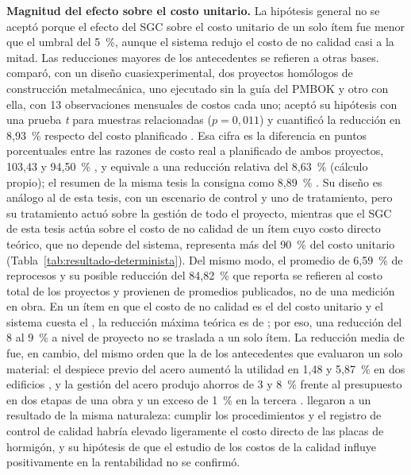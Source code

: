 \textbf{Magnitud del efecto sobre el costo unitario.} La hipótesis general no se aceptó porque el efecto del SGC sobre el costo unitario de un solo ítem fue menor que el umbral del 5~\%, aunque el sistema redujo el costo de no calidad casi a la mitad. Las reducciones mayores de los antecedentes se refieren a otras bases. \textcite[p.~22]{salazar2018} comparó, con un diseño cuasiexperimental, dos proyectos homólogos de construcción metalmecánica, uno ejecutado sin la guía del PMBOK y otro con ella, con 13 observaciones mensuales de costos cada uno; aceptó su hipótesis con una prueba \emph{t} para muestras relacionadas ($p = 0{,}011$) y cuantificó la reducción en 8,93~\% respecto del costo planificado \parencite[p.~41]{salazar2018}. Esa cifra es la diferencia en puntos porcentuales entre las razones de costo real a planificado de ambos proyectos, 103,43 y 94,50~\% \parencite[p.~40]{salazar2018}, y equivale a una reducción relativa del 8,63~\% (cálculo propio); el resumen de la misma tesis la consigna como 8,89~\% \parencite[p.~vii]{salazar2018}. Su diseño es análogo al de esta tesis, con un escenario de control y uno de tratamiento, pero su tratamiento actuó sobre la gestión de todo el proyecto, mientras que el SGC de esta tesis actúa sobre el costo de no calidad de un ítem cuyo costo directo teórico, que no depende del sistema, representa más del 90~\% del costo unitario (Tabla~\ref{tab:resultado-determinista}). Del mismo modo, el promedio de 6,59~\% de reprocesos y su posible reducción del 84,82~\% que reporta \textcite[pp.~5, 20]{alvarez2014} se refieren al costo total de los proyectos y provienen de promedios publicados, no de una medición en obra. En un ítem en que el costo de no calidad es el \CNCsinDetPct{} del costo unitario y el sistema cuesta el \CCconDetPct{}, la reducción máxima teórica es de \rMaxTeorico{}; por eso, una reducción del 8 al 9~\% a nivel de proyecto no se traslada a un solo ítem. La reducción media de \rMedia{} fue, en cambio, del mismo orden que la de los antecedentes que evaluaron un solo material: el despiece previo del acero aumentó la utilidad en 1,48 y 5,87~\% en dos edificios \parencite[p.~190]{chino2024}, y la gestión del acero produjo ahorros de 3 y 8~\% frente al presupuesto en dos etapas de una obra y un exceso de 1~\% en la tercera \parencite[p.~80]{galarza2011}. \textcite[pp.~81--82]{aguilar2016} llegaron a un resultado de la misma naturaleza: cumplir los procedimientos y el registro de control de calidad habría elevado ligeramente el costo directo de las placas de hormigón, y su hipótesis de que el estudio de los costos de la calidad influye positivamente en la rentabilidad no se confirmó.

